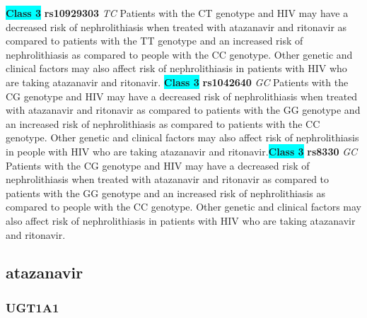 \documentclass{book}
\begin{document}
\begin{center}
\textbf{\colorbox{cyan} {Class 3}} \textbf{ rs10929303 } \textit{ TC }
Patients with the CT genotype and HIV may have a decreased risk of nephrolithiasis when treated with atazanavir and ritonavir as compared to patients with the TT genotype and an increased risk of nephrolithiasis as compared to people with the CC genotype. Other genetic and clinical factors may also affect risk of nephrolithiasis in patients with HIV who are taking atazanavir and ritonavir. \textbf{\colorbox{cyan} {Class 3}} \textbf{ rs1042640 } \textit{ GC }
Patients with the CG genotype and HIV may have a decreased risk of nephrolithiasis when treated with atazanavir and ritonavir as compared to patients with the GG genotype and an increased risk of nephrolithiasis as compared to patients with the CC genotype. Other genetic and clinical factors may also affect risk of nephrolithiasis in people with HIV who are taking atazanavir and ritonavir.\textbf{\colorbox{cyan} {Class 3}} \textbf{ rs8330 } \textit{ GC }
Patients with the CG genotype and HIV may have a decreased risk of nephrolithiasis when treated with atazanavir and ritonavir as compared to patients with the GG genotype and an increased risk of nephrolithiasis as compared to people with the CC genotype. Other genetic and clinical factors may also affect risk of nephrolithiasis in patients with HIV who are taking atazanavir and ritonavir.


\end{center}\subsection{ atazanavir }


\subsubsection{ UGT1A1 }
\end{document}
